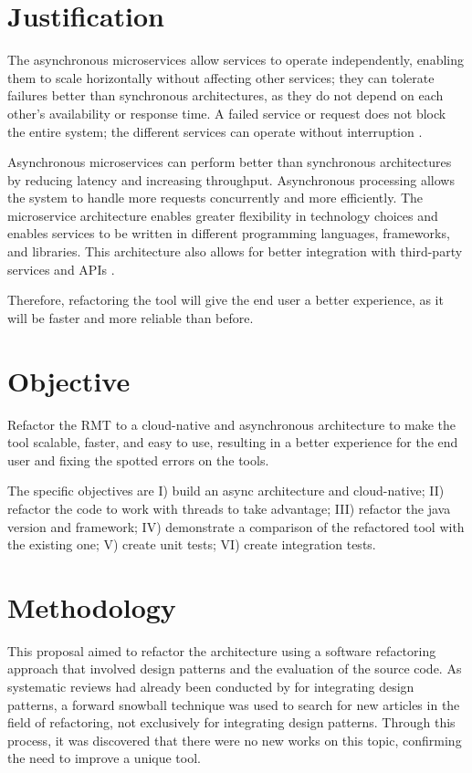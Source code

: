 \section{Justification}
The asynchronous microservices allow services to operate independently, enabling them to scale horizontally without affecting other services; they can tolerate failures better than synchronous architectures, as they do not depend on each other's availability or response time. A failed service or request does not block the entire system; the different services can operate without interruption \cite{microservices-comuni}.

Asynchronous microservices can perform better than synchronous architectures by reducing latency and increasing throughput. Asynchronous processing allows the system to handle more requests concurrently and more efficiently. The microservice architecture enables greater flexibility in technology choices and enables services to be written in different programming languages, frameworks, and libraries. This architecture also allows for better integration with third-party services and APIs \cite{larrucea2018}.

Therefore, refactoring the tool will give the end user a better experience, as it will be faster and more reliable than before.

\section{Objective}
Refactor the RMT to a cloud-native and asynchronous architecture to make the tool scalable, faster, and easy to use, resulting in a better experience for the end user and fixing the spotted errors on the tools.

The specific objectives are I) build an async architecture and cloud-native; II) refactor the code to work with threads to take advantage; III) refactor the java version and framework; IV) demonstrate a comparison of the refactored tool with the existing one; V) create unit tests; VI) create integration tests.

\section{Methodology}
This proposal aimed to refactor the architecture using a software refactoring approach that involved design patterns and the evaluation of the source code. As systematic reviews had already been conducted by \textcite{beluzzo2018abordagem} for integrating design patterns, a forward snowball technique was used to search for new articles in the field of refactoring, not exclusively for integrating design patterns. Through this process, it was discovered that there were no new works on this topic, confirming the need to improve a unique tool.

